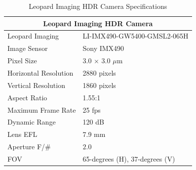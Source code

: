 \documentclass{erauthesis}
\begin{document}
\begin{table}[htpb]
\centering
\caption{Leopard Imaging HDR Camera Specifications}
\begin{tabular}{ll}
\hline
\multicolumn{2}{c}{Leopard Imaging HDR Camera}\\
\hline
\hline
Leopard Imaging & LI-IMX490-GW5400-GMSL2-065H \\
Image Sensor & Sony IMX490 \\
Pixel Size & 3.0 $\times$ 3.0 $\mu$m \\
Horizontal Resolution & 2880 pixels \\
Vertical Resolution & 1860 pixels \\
Aspect Ratio & 1.55:1 \\
Maximum Frame Rate & 25 fps \\
Dynamic Range & 120 dB \\
Lens \Ac{EFL} & 7.9 mm\\
Aperture F/\# & $2.0$ \\
\Ac{FOV} & 65-degrees (H), 37-degrees (V) \\
\hline
\end{tabular}
\label{table:hdr_camera_specs}
\end{table}




\end{document}
